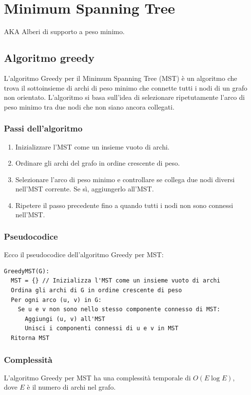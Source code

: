 \chapter{Minimum Spanning Tree}

AKA Alberi di supporto a peso minimo.

\section{Algoritmo greedy}
L'algoritmo Greedy per il Minimum Spanning Tree (MST) è un algoritmo che trova il sottoinsieme di archi di peso minimo che connette tutti i nodi di un grafo non orientato. L'algoritmo si basa sull'idea di selezionare ripetutamente l'arco di peso minimo tra due nodi che non siano ancora collegati.

\subsection{Passi dell'algoritmo}

\begin{enumerate}
  \item Inizializzare l'MST come un insieme vuoto di archi.
  \item Ordinare gli archi del grafo in ordine crescente di peso.
  \item Selezionare l'arco di peso minimo e controllare se collega due nodi diversi nell'MST corrente. Se sì, aggiungerlo all'MST.
  \item Ripetere il passo precedente fino a quando tutti i nodi non sono connessi nell'MST.
\end{enumerate}

\subsection{Pseudocodice}

Ecco il pseudocodice dell'algoritmo Greedy per MST:

\begin{verbatim}
GreedyMST(G):
  MST = {} // Inizializza l'MST come un insieme vuoto di archi
  Ordina gli archi di G in ordine crescente di peso
  Per ogni arco (u, v) in G:
    Se u e v non sono nello stesso componente connesso di MST:
      Aggiungi (u, v) all'MST
      Unisci i componenti connessi di u e v in MST
  Ritorna MST
\end{verbatim}

\subsection{Complessità}
L'algoritmo Greedy per MST ha una complessità temporale di $O(E \log E)$, dove $E$ è il numero di archi nel grafo.

